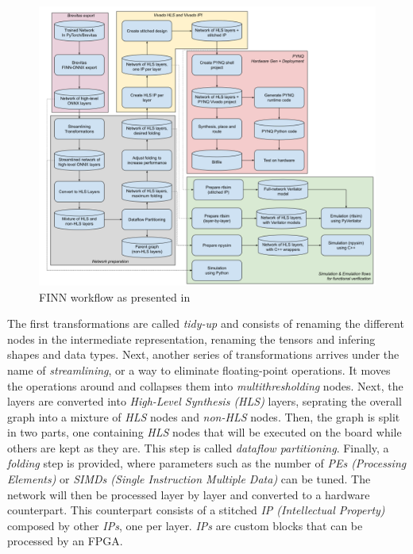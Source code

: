 \begin{figure}[htbp]
	\centering
		\includegraphics[width=\textwidth]{Figures/FinnWorkflow.png}
	\caption[Inference Optimisations]{FINN workflow as presented in \cite{Umuroglu2017a, Blott2018}}
	\label{fig:FinnWorkflow}
\end{figure}

The first transformations are called \emph{tidy-up} and consists of renaming the different nodes in the intermediate representation, renaming the tensors and infering shapes and data types. Next, another series of transformations arrives under the name of \emph{streamlining}, or a way to eliminate floating-point operations. It moves the operations around and collapses them into \emph{multithresholding} nodes. Next, the layers are converted into \emph{High-Level Synthesis (HLS)} layers, seprating the overall graph into a mixture of \emph{HLS} nodes and \emph{non-HLS} nodes. Then, the graph is split in two parts, one containing \emph{HLS} nodes that will be executed on the board while others are kept as they are. This step is called \emph{dataflow partitioning}. Finally, a \emph{folding} step is provided, where parameters such as the number of \emph{PEs (Processing Elements)} or \emph{SIMDs (Single Instruction Multiple Data)} can be tuned. The network will then be processed layer by layer and converted to a hardware counterpart. This counterpart consists of a stitched \emph{IP (Intellectual Property)} composed by other \emph{IPs}, one per layer. \emph{IPs} are custom blocks that can be processed by an FPGA.


